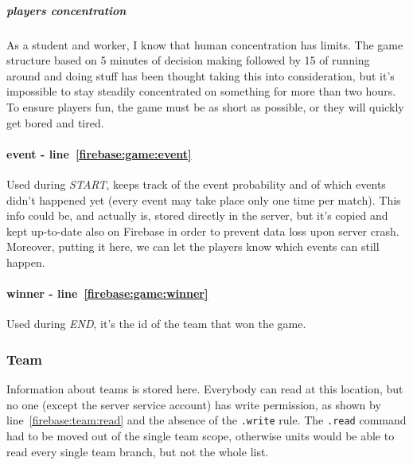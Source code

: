 				\subparagraph{players concentration}
				As a student and worker, I know that human concentration has limits. The game structure based on 5 minutes of decision making followed by 15 of running around and doing stuff has been thought taking this into consideration, but it's impossible to stay steadily concentrated on something for more than two hours.
				To ensure players fun, the game must be as short as possible, or they will quickly get bored and tired.
				
				
				\paragraph{event - line~\ref{firebase:game:event}}
				Used during \emph{START}, keeps track of the event probability and of which events didn't happened yet (every event may take place only one time per match). This info could be, and actually is, stored directly in the server, but it's copied and kept up-to-date also on Firebase in order to prevent data loss upon server crash. Moreover, putting it here, we can let the players know which events can still happen.
				
				\paragraph{winner - line~\ref{firebase:game:winner}}
				Used during \emph{END}, it's the id of the team that won the game.
			
			\subsubsection{Team}
			
				
				
				Information about teams is stored here.
				Everybody can read at this location, but no one (except the server service account) has write permission, as shown by line~\ref{firebase:team:read} and the absence of the \lstinline|.write| rule.
				The \lstinline|.read| command had to be moved out of the single team scope, otherwise units would be able to read every single team branch, but not the whole list. \\
			
			
